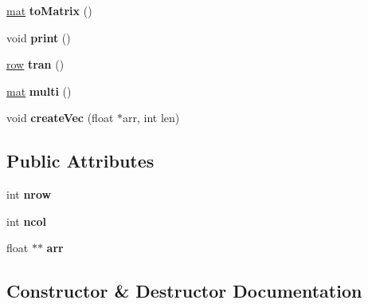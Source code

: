 \begin{DoxyCompactItemize}
\item 
\mbox{\label{class_matrix_vector_1_1vec_a621b533b86d8986174e4b88c875a6c63}} 
\mbox{\hyperlink{class_matrix_vector_1_1mat}{mat}} {\bfseries to\+Matrix} ()
\item 
\mbox{\label{class_matrix_vector_1_1vec_a4602af813ed7eb84612e578aab0b91d0}} 
void {\bfseries print} ()
\item 
\mbox{\label{class_matrix_vector_1_1vec_a2a2c95e44ec5fef8cbdcc8beca765b42}} 
\mbox{\hyperlink{class_matrix_vector_1_1row}{row}} {\bfseries tran} ()
\item 
\mbox{\label{class_matrix_vector_1_1vec_a29697cf7bf95776710f673d6ea076d0f}} 
\mbox{\hyperlink{class_matrix_vector_1_1mat}{mat}} {\bfseries multi} ()
\item 
\mbox{\label{class_matrix_vector_1_1vec_aaebd70c13be5311384dcf2bfdf4435fe}} 
void {\bfseries create\+Vec} (float $\ast$arr, int len)
\end{DoxyCompactItemize}
\subsection*{Public Attributes}
\begin{DoxyCompactItemize}
\item 
\mbox{\label{class_matrix_vector_1_1vec_a9b2e20b78d4e28c76c5de2da43a9c952}} 
int {\bfseries nrow}
\item 
\mbox{\label{class_matrix_vector_1_1vec_aa0dc168f0f03f45db4aa9eee3234aa9c}} 
int {\bfseries ncol}
\item 
\mbox{\label{class_matrix_vector_1_1vec_a5de4551d33631073af9e3fa31b13a508}} 
float $\ast$$\ast$ {\bfseries arr}
\end{DoxyCompactItemize}


\subsection{Constructor \& Destructor Documentation}
\mbox{\label{class_matrix_vector_1_1vec_ab6e2a9eafc93e30f80fa55c6c535d390}} 
